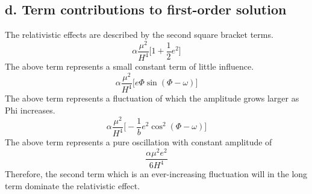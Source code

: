 \subsection{d. Term contributions to first-order solution}
The relativistic effects are described by the second square bracket terms. 
\begin{equation}
\alpha \frac{\mu^2}{H^4}\Big[1+\frac{1}{2}e^2\Big]
\end{equation}
The above term represents a small constant term of little influence.
\begin{equation}
\alpha \frac{\mu^2}{H^4}\Big[e \Phi \sin(\Phi-\omega)\Big]
\end{equation}
The above term represents a fluctuation of which the amplitude grows larger as Phi increases.
\begin{equation}
\alpha \frac{\mu^2}{H^4}\Big[-\frac{1}{b}e^2 \cos^2(\Phi-\omega)\Big]
\end{equation}
The above term represents a pure oscillation with constant amplitude of
\begin{equation}
\frac{\alpha \mu^2 e^2}{6 H^4}
\end{equation}
Therefore, the second term which is an ever-increasing fluctuation will in the long term dominate the relativistic effect.
